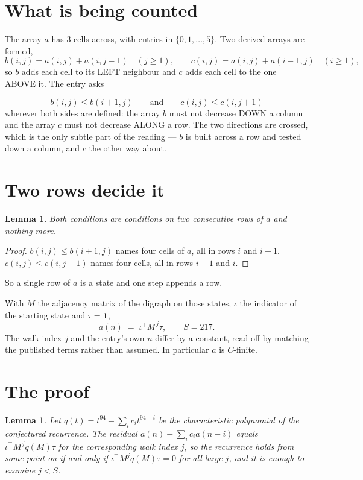 \documentclass[11pt,a4paper]{article}
\theoremstyle{plain}
\newtheorem{lemma}[theorem]{Lemma}
\theoremstyle{definition}
\begin{document}
\section{What is being counted}

The array $a$ has $3$ cells across, with entries in $\{0,1,\dots,5\}$. Two derived arrays are formed,
\[
b(i,j)=a(i,j)+a(i,j-1)\quad(j\ge1),\qquad c(i,j)=a(i,j)+a(i-1,j)\quad(i\ge1),
\]
so $b$ adds each cell to its LEFT neighbour and $c$ adds each cell to the one ABOVE it. The
entry asks

\[
b(i,j)\le b(i{+}1,j)\qquad\text{and}\qquad c(i,j)\le c(i,j{+}1)
\]
wherever both sides are defined: the array $b$ must not decrease DOWN a column and the array
$c$ must not decrease ALONG a row. The two directions are crossed, which is the only subtle
part of the reading --- $b$ is built across a row and tested down a column, and $c$ the other
way about.


\section{Two rows decide it}

\begin{lemma}\label{lem:win}
Both conditions are conditions on two consecutive rows of $a$ and nothing more.
\end{lemma}

\begin{proof}
$b(i,j)\le b(i{+}1,j)$ names four cells of $a$, all in rows $i$ and $i+1$. $c(i,j)\le
c(i,j{+}1)$ names four cells, all in rows $i-1$ and $i$.
\end{proof}

So a single row of $a$ is a state and one step appends a row.

With $M$ the adjacency matrix of the digraph on those states, $\iota$ the indicator of the
starting state and $\tau=\mathbf{1}$,
\[
a(n)\;=\;\iota^{\!\top}M^{\,j}\tau ,\qquad S=217.
\]
The walk index $j$ and the entry's own $n$ differ by a constant, read off by matching the
published terms rather than assumed. In particular $a$ is $C$-finite.

\section{The proof}

\begin{lemma}\label{lem:crit}
Let $q(t)=t^{94}-\sum_i c_it^{94-i}$ be the characteristic polynomial of the
conjectured recurrence. The residual $a(n)-\sum_ic_ia(n-i)$ equals
$\iota^{\!\top}M^{\,j}q(M)\tau$ for the corresponding walk index $j$, so the recurrence
holds from some point on if and only if $\iota^{\!\top}M^{j}q(M)\tau=0$ for all large $j$,
and it is enough to examine $j<S$.
\end{lemma}
\end{document}
